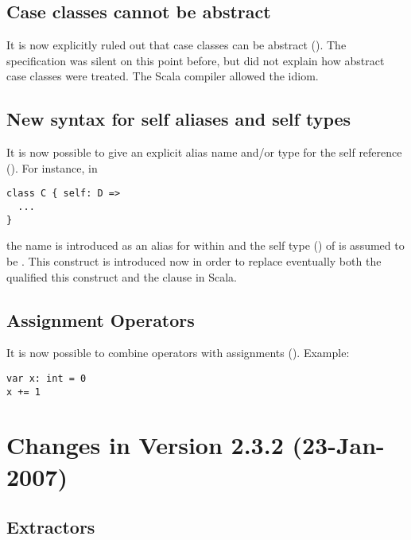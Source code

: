 \subsection*{Case classes cannot be abstract}

It is now explicitly ruled out that case classes can be abstract
(). The specification was silent on this point
before, but did not explain how abstract case classes were
treated. The Scala compiler allowed the idiom.

\subsection*{New syntax for self aliases and self types}

It is now possible to give an explicit alias name and/or type for the
self reference  (). For instance, in
\begin{lstlisting}
class C { self: D => 
  ...
}
\end{lstlisting}
the name  is introduced as an alias for  within
 and the self type () of  is
assumed to be . This construct is introduced now in order to
replace eventually both the qualified this construct  and
the  clause in Scala.

\subsection*{Assignment Operators}

It is now possible to combine operators with assignments (). Example:
\begin{lstlisting}
var x: int = 0
x += 1
\end{lstlisting}

\section*{Changes in Version 2.3.2 (23-Jan-2007)}

\subsection*{Extractors}

